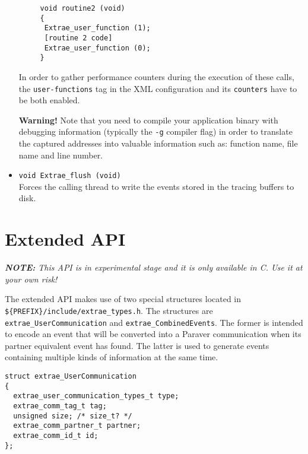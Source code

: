 \begin{itemize}
\begin{verbatim}
     void routine2 (void)
     {
      Extrae_user_function (1);
      [routine 2 code]
      Extrae_user_function (0);
     }
   \end{verbatim}

   In order to gather performance counters during the execution of these calls, the {\tt user-functions} tag in the XML configuration and its {\tt counters} have to be both enabled.

	\textbf{Warning!} Note that you need to compile your application binary with debugging information (typically the \texttt{-g} compiler flag) in order to translate the captured addresses into valuable information such as: function name, file name and line number.

 \item {\tt void Extrae\_flush (void)}\\
  Forces the calling thread to write the events stored in the tracing buffers to disk.

\end{itemize}

\section{Extended API}\label{sec:ExtendedAPI}

{\em {\bf NOTE:} This API is in experimental stage and it is only available in C. Use it at your own risk!}

The extended API makes use of two special structures located in {\tt \$\{PREFIX\}/include/extrae\_types.h}. The structures are {\tt extrae\_UserCommunication} and {\tt extrae\_CombinedEvents}. The former is intended to encode an event that will be converted into a Paraver communication when its partner equivalent event has found. The latter is used to generate events containing multiple kinds of information at the same time.

\begin{verbatim}
struct extrae_UserCommunication
{
  extrae_user_communication_types_t type;
  extrae_comm_tag_t tag;
  unsigned size; /* size_t? */
  extrae_comm_partner_t partner;
  extrae_comm_id_t id;
};
\end{verbatim}

